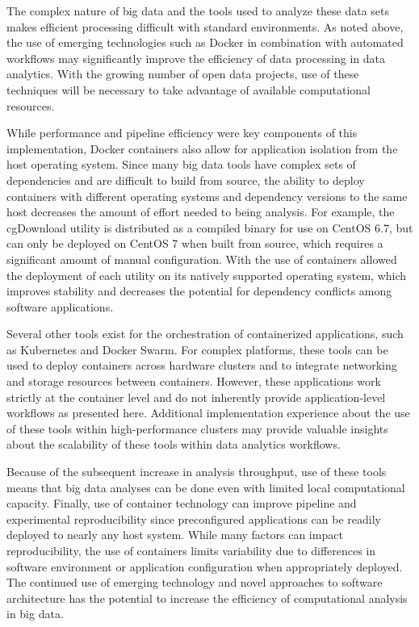 \documentclass[sigconf]{acmart}
\begin{document}
	The complex nature of big data and the tools used to analyze these data sets makes efficient processing difficult with standard environments. As noted above, the use of emerging technologies such as Docker in combination with automated workflows may significantly improve the efficiency of data processing in data analytics. With the growing number of open data projects, use of these techniques will be necessary to take advantage of available computational resources.
	
	While performance and pipeline efficiency were key components of this implementation, Docker containers also allow for application isolation from the host operating system. Since many big data tools have complex sets of dependencies and are difficult to build from source, the ability to deploy containers with different operating systems and dependency versions to the same host decreases the amount of effort needed to being analysis. For example, the cgDownload utility is distributed as a compiled binary for use on CentOS 6.7, but can only be deployed on CentOS 7 when built from source, which requires a significant amount of manual configuration. With the use of containers allowed the deployment of each utility on its natively supported operating system, which improves stability and decreases the potential for dependency conflicts among software applications.
	
	Several other tools exist for the orchestration of containerized applications, such as Kubernetes and Docker Swarm. For complex platforms, these tools can be used to deploy containers across hardware clusters and to integrate networking and storage resources between containers. However, these applications work strictly at the container level and do not inherently provide application-level workflows as presented here. Additional implementation experience about the use of these tools within high-performance clusters may provide valuable insights about the scalability of these tools within data analytics workflows.
	
	Because of the subsequent increase in analysis throughput, use of these tools means that big data analyses can be done even with limited local computational capacity. Finally, use of container technology can improve pipeline and experimental reproducibility since preconfigured applications can be readily deployed to nearly any host system. While many factors can impact reproducibility, the use of containers limits variability due to differences in software environment or application configuration when appropriately deployed. The continued use of emerging technology and novel approaches to software architecture has the potential to increase the efficiency of computational analysis in big data.


 
\end{document}
